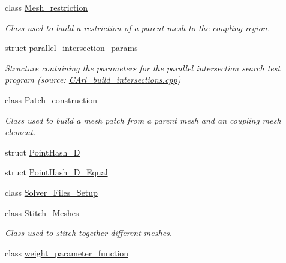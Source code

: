 \begin{DoxyCompactItemize}
class \hyperlink{classcarl_1_1_mesh__restriction}{Mesh\+\_\+restriction}
\begin{DoxyCompactList}\small\item\em Class used to build a restriction of a parent mesh to the coupling region. \end{DoxyCompactList}\item 
struct \hyperlink{structcarl_1_1parallel__intersection__params}{parallel\+\_\+intersection\+\_\+params}
\begin{DoxyCompactList}\small\item\em Structure containing the parameters for the parallel intersection search test program (source\+: \hyperlink{_c_arl__build__intersections_8cpp}{C\+Arl\+\_\+build\+\_\+intersections.\+cpp}) \end{DoxyCompactList}\item 
class \hyperlink{classcarl_1_1_patch__construction}{Patch\+\_\+construction}
\begin{DoxyCompactList}\small\item\em Class used to build a mesh patch from a parent mesh and an coupling mesh element. \end{DoxyCompactList}\item 
struct \hyperlink{structcarl_1_1_point_hash__3_d}{Point\+Hash\+\_\+D}
\item 
struct \hyperlink{structcarl_1_1_point_hash__3_d___equal}{Point\+Hash\+\_\+D\+\_\+\+Equal}
\item 
class \hyperlink{classcarl_1_1_solver___files___setup}{Solver\+\_\+\+Files\+\_\+\+Setup}
\item 
class \hyperlink{classcarl_1_1_stitch___meshes}{Stitch\+\_\+\+Meshes}
\begin{DoxyCompactList}\small\item\em Class used to stitch together different meshes. \end{DoxyCompactList}\item 
class \hyperlink{classcarl_1_1weight__parameter__function}{weight\+\_\+parameter\+\_\+function}
\end{DoxyCompactItemize}
